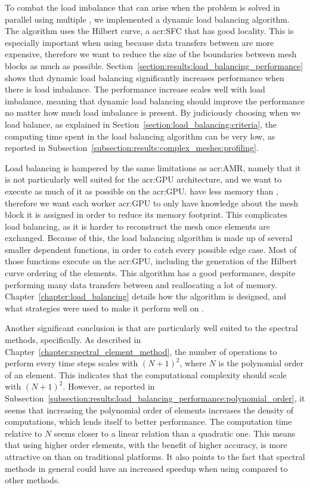 To combat the load imbalance that can arise when the problem is solved in parallel using multiple
, we implemented a dynamic load balancing algorithm. The algorithm uses the
Hilbert curve, a \acrlong{acr:SFC} that has good locality. This is especially important when using
 because data transfers between  are more expensive,
therefore we want to reduce the size of the boundaries between mesh blocks as much as possible.
Section~\ref{section:results:load_balancing_performance} shows that dynamic load balancing
significantly increases performance when there is load imbalance. The performance increase scales
well with load imbalance, meaning that dynamic load balancing should improve the performance no
matter how much load imbalance is present. By judiciously choosing when we load balance, as
explained in Section~\ref{section:load_balancing:criteria}, the computing time spent in the load
balancing algorithm can be very low, as reported in
Subsection~\ref{subsection:results:complex_meshes:profiling}. 

Load balancing is hampered  by the same limitations as \acrshort{acr:AMR}, namely that it is not
particularly well suited for the \acrshort{acr:GPU} architecture, and we want to execute as much of
it as possible on the \acrshort{acr:GPU}.  have less memory than
, therefore we want each worker \acrshort{acr:GPU} to only have knowledge about
the mesh block it is assigned in order to reduce its memory footprint. This complicates load
balancing, as it is harder to reconstruct the mesh once elements are exchanged. Because of this, the
load balancing algorithm is made up of several smaller dependent functions, in order to catch every
possible edge case. Most of those functions execute on the \acrshort{acr:GPU}, including the
generation of the Hilbert curve ordering of the elements. This algorithm has a good performance,
despite performing many data transfers between  and reallocating a lot of
memory. Chapter~\ref{chapter:load_balancing} details how the algorithm is designed, and what
strategies were used to make it perform well on .

Another significant conclusion is that  are particularly well suited to the
spectral methods, specifically. As described in Chapter~\ref{chapter:spectral_element_method}, the
number of operations to perform every time steps scales with \({\left( N + 1 \right)}^2\), where
\(N\) is the polynomial order of an element. This indicates that the computational complexity should
scale with \({\left( N + 1 \right)}^2\). However, as reported in
Subsection~\ref{subsection:results:load_balancing_performance:polynomial_order}, it seems that
increasing the polynomial order of elements increases the density of computations, which lends
itself to better performance. The computation time relative to \(N\) seems closer to a linear
relation than a quadratic one. This means that using higher order elements, with the benefit of
higher accuracy, is more attractive on  than on traditional platforms. It also
points to the fact that spectral methods in general could have an increased speedup when using
 compared to other methods.

